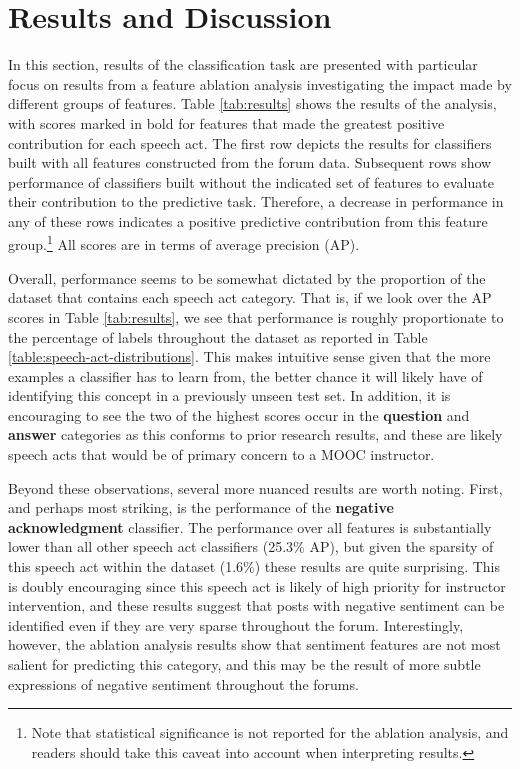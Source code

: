 \documentclass[twoside]{article}
\begin{document}
\section{Results and Discussion} \label{sec:results}
In this section, results of the classification task are presented with particular focus on results from a feature ablation analysis investigating the impact made by different groups of features. Table \ref{tab:results} shows the results of the analysis, with scores marked in bold for features that made the greatest positive contribution for each speech act. The first row depicts the results for classifiers built with all features constructed from the forum data. Subsequent rows show performance of classifiers built without the indicated set of features to evaluate their contribution to the predictive task. Therefore, a decrease in performance in any of these rows indicates a positive predictive contribution from this feature group.\footnote{Note that statistical significance is not reported for the ablation analysis, and readers should take this caveat into account when interpreting results.} All scores are in terms of average precision (AP).
\par
Overall, performance seems to be somewhat dictated by the proportion of the dataset that contains each speech act category. That is, if we look over the AP scores in Table \ref{tab:results}, we see that performance is roughly proportionate to the percentage of labels throughout the dataset as reported in Table \ref{table:speech-act-distributions}. This makes intuitive sense given that the more examples a classifier has to learn from, the better chance it will likely have of identifying this concept in a previously unseen test set. In addition, it is encouraging to see the two of the highest scores occur in the \textbf{question} and \textbf{answer} categories as this conforms to prior research results, and these are likely speech acts that would be of primary concern to a MOOC instructor.
\par
Beyond these observations, several more nuanced results are worth noting. First, and perhaps most striking, is the performance of the \textbf{negative acknowledgment} classifier. The performance over all features is substantially lower than all other speech act classifiers (25.3\% AP), but given the sparsity of this speech act within the dataset (1.6\%) these results are quite surprising. This is doubly encouraging since this speech act is likely of high priority for instructor intervention, and these results suggest that posts with negative sentiment can be identified even if they are very sparse throughout the forum. Interestingly, however, the ablation analysis results show that sentiment features are not most salient for predicting this category, and this may be the result of more subtle expressions of negative sentiment throughout the forums.
\end{document}
